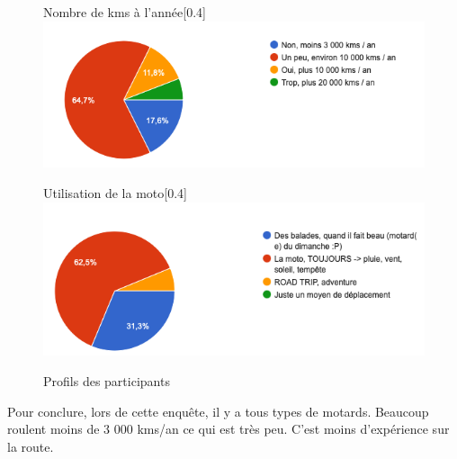 \begin{figure}[H]
  \begin{subcaptionbox}{Nombre de kms à l'année}[0.4\linewidth]
    {\includegraphics[width=\linewidth]{coeur_memoire/graphique/nb_km_an.png}}
  \end{subcaptionbox}
  \hfill
  \begin{subcaptionbox}{Utilisation de la moto}[0.4\linewidth]
    {\includegraphics[width=\linewidth]{coeur_memoire/graphique/utilisation_moto.png}}
  \end{subcaptionbox}
  \caption{Profils des participants}
\end{figure}

Pour conclure, lors de cette enquête, il y a tous types de motards. Beaucoup roulent moins de 3 000 kms/an ce qui est très peu. C'est moins d'expérience sur la route.

